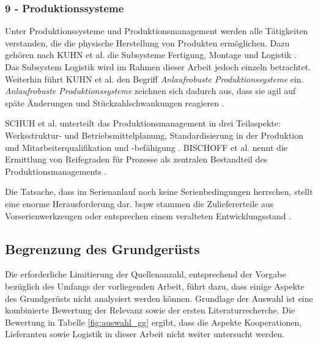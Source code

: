\subsubsection*{9 - Produktionssysteme}
Unter Produktionssysteme und Produktionsmanagement werden alle Tätigkeiten verstanden, die die physische Herstellung von Produkten ermöglichen. Dazu gehören nach KUHN et al. die Subsysteme Fertigung, Montage und Logistik \autocite{Kuhn2002}. Das Subsystem Logistik wird im Rahmen dieser Arbeit jedoch einzeln betrachtet. Weiterhin führt KUHN et al. den Begriff \textit{Anlaufrobuste Produktionssysteme} ein. \textit{Anlaufrobuste Produktionssysteme} zeichnen sich dadurch aus, dass sie agil auf späte Änderungen und Stückzahlschwankungen reagieren \autocite[20]{Bischoff2007}. 

SCHUH et al. unterteilt das Produktionsmanagement in drei Teilaspekte: Werksstruktur- und Betriebsmittelplanung, Standardisierung in der Produktion und Mitarbeiterqualifikation und {-befähigung} \autocite[177]{Schuh2008}. 
BISCHOFF et al. nennt die Ermittlung von Reifegraden für Prozesse als zentralen Bestandteil des Produktionsmanagements \autocite[20]{Bischoff2007}. 

Die Tatsache, dass im Serienanlauf noch keine Serienbedingungen herrschen, stellt eine enorme Herausforderung dar. \Gls{bspw} stammen die Zuliefererteile aus Vorserienwerkzeugen oder entsprechen einem veralteten Entwicklungsstand \autocite[21]{Kuhn2002}.

\subsection*{Begrenzung des Grundgerüsts}
Die erforderliche Limitierung der Quellenanzahl, entsprechend der Vorgabe bezüglich des Umfangs der vorliegenden Arbeit, führt dazu, dass einige Aspekte des Grundgerüsts nicht analysiert werden können.
Grundlage der Auswahl ist eine kombinierte Bewertung der Relevanz sowie der ersten Literaturrecherche. 
Die Bewertung in Tabelle \ref{fig:auswahl_gg} ergibt, dass die Aspekte Kooperationen, Lieferanten sowie Logistik in dieser Arbeit nicht weiter untersucht werden. 

